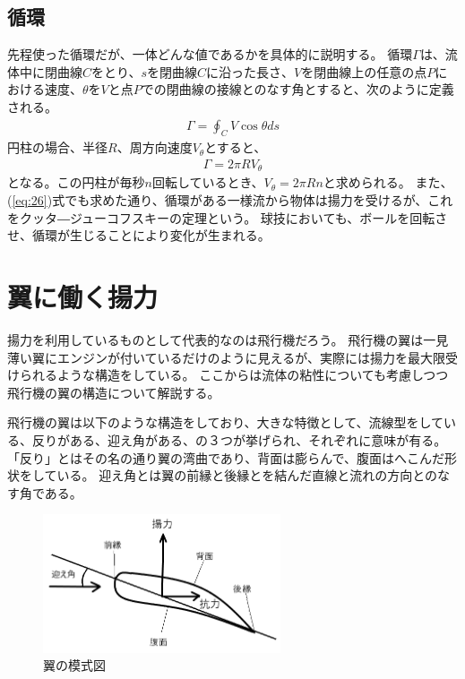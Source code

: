 \documentclass[10pt,b5paper,papersize,dvipdfmx]{jsbook}
\begin{document}
\subsection{循環}
先程使った循環だが、一体どんな値であるかを具体的に説明する。
循環$\Gamma$は、流体中に閉曲線$C$をとり、$s$を閉曲線$C$に沿った長さ、$V$を閉曲線上の任意の点$P$における速度、$\theta$を$V$と点$P$での閉曲線の接線とのなす角とすると、次のように定義される。
\begin{align}
  \Gamma = \oint_C V\cos\theta ds
\end{align}
円柱の場合、半径$R$、周方向速度$V_\theta$とすると、
\begin{align}
  \Gamma = 2\pi RV_\theta
\end{align}
となる。この円柱が毎秒$n$回転しているとき、$V_\theta = 2\pi Rn$と求められる。
また、(\ref{eq:26})式でも求めた通り、循環がある一様流から物体は揚力を受けるが、これをクッタ―ジューコフスキーの定理という。
球技においても、ボールを回転させ、循環が生じることにより変化が生まれる。

\section{翼に働く揚力}
揚力を利用しているものとして代表的なのは飛行機だろう。
飛行機の翼は一見薄い翼にエンジンが付いているだけのように見えるが、実際には揚力を最大限受けられるような構造をしている。
ここからは流体の粘性についても考慮しつつ飛行機の翼の構造について解説する。
\par
飛行機の翼は以下のような構造をしており、大きな特徴として、流線型をしている、反りがある、迎え角がある、の３つが挙げられ、それぞれに意味が有る。
「反り」とはその名の通り翼の湾曲であり、背面は膨らんで、腹面はへこんだ形状をしている。
迎え角とは翼の前縁と後縁とを結んだ直線と流れの方向とのなす角である。
\vspace{2zw} %
\begin{figure}[ht]
  \centering
  \includegraphics[width=70mm]{img/ryuutai4.png}
  \caption{翼の模式図}
\end{figure}
\end{document}
